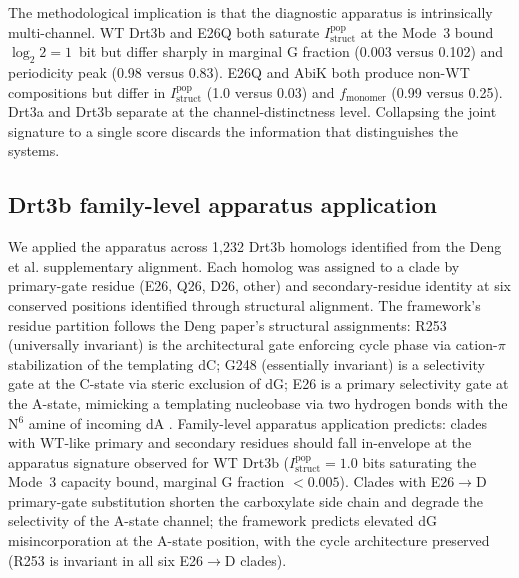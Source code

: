 \documentclass[aps,prx,reprint,amsmath,amssymb,floatfix,superscriptaddress,nofootinbib]{revtex4-2}
\theoremstyle{plain-thm}
\theoremstyle{definition-thm}
\newcommand{\Istructpop}{I_{\mathrm{struct}}^{\mathrm{pop}}}
\newcommand{\fmonomer}{f_{\mathrm{monomer}}}
\begin{document}
The methodological implication is that the diagnostic apparatus is intrinsically multi-channel. WT Drt3b and E26Q both saturate $\Istructpop$ at the Mode~3 bound $\log_2 2 = 1$~bit but differ sharply in marginal G fraction (0.003 versus 0.102) and periodicity peak (0.98 versus 0.83). E26Q and AbiK both produce non-WT compositions but differ in $\Istructpop$ (1.0 versus 0.03) and $\fmonomer$ (0.99 versus 0.25). Drt3a and Drt3b separate at the channel-distinctness level. Collapsing the joint signature to a single score discards the information that distinguishes the systems.

\subsection{Drt3b family-level apparatus application}

We applied the apparatus across 1{,}232 Drt3b homologs identified from the Deng et al. supplementary alignment. Each homolog was assigned to a clade by primary-gate residue (E26, Q26, D26, other) and secondary-residue identity at six conserved positions identified through structural alignment. The framework's residue partition follows the Deng paper's structural assignments: R253 (universally invariant) is the architectural gate enforcing cycle phase via cation-$\pi$ stabilization of the templating dC; G248 (essentially invariant) is a selectivity gate at the C-state via steric exclusion of dG; E26 is a primary selectivity gate at the A-state, mimicking a templating nucleobase via two hydrogen bonds with the N$^6$ amine of incoming dA \citep{Deng2026}. Family-level apparatus application predicts: clades with WT-like primary and secondary residues should fall in-envelope at the apparatus signature observed for WT Drt3b ($\Istructpop = 1.0$ bits saturating the Mode~3 capacity bound, marginal G fraction $< 0.005$). Clades with E26$\to$D primary-gate substitution shorten the carboxylate side chain and degrade the selectivity of the A-state channel; the framework predicts elevated dG misincorporation at the A-state position, with the cycle architecture preserved (R253 is invariant in all six E26$\to$D clades).
\end{document}
